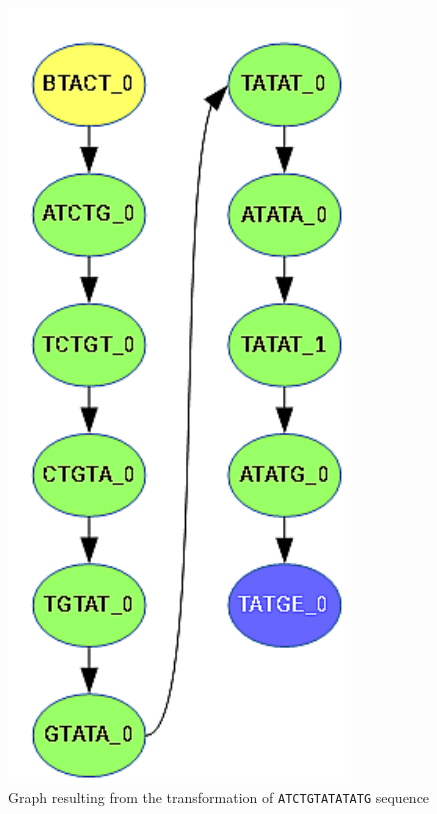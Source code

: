 \begin{figure}[h]
	\centering
	\includegraphics{img/ref-my.pdf}
	\caption{Graph resulting from the transformation of \texttt{ATCTGTATATATG} sequence}
	\label{fig:ref-my}
\end{figure}

